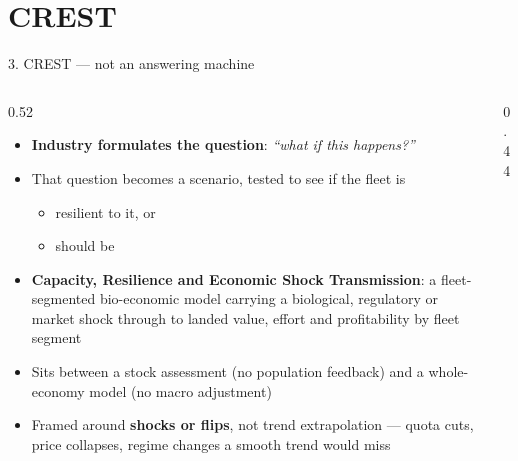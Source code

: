 \documentclass[10pt,aspectratio=169]{beamer}
\begin{document}
\section{CREST}

\begin{frame}{3. CREST --- not an answering machine}
  \begin{columns}[T]
    \begin{column}{0.52\textwidth}
      \footnotesize
      \begin{itemize}
        \item \textbf{Industry formulates the question}: \textit{``what if this happens?''}
        \item That question becomes a scenario, tested to see if the fleet is
          \begin{itemize}
            \item resilient to it, or
            \item should be
          \end{itemize}
        \item \textbf{Capacity, Resilience and Economic Shock Transmission}: a fleet-segmented bio-economic model carrying a biological, regulatory or market shock through to landed value, effort and profitability by fleet segment
        \item Sits between a stock assessment (no population feedback) and a whole-economy model (no macro adjustment)
        \item Framed around \textbf{shocks or flips}, not trend extrapolation --- quota cuts, price collapses, regime changes a smooth trend would miss
      \end{itemize}
    \end{column}
    \begin{column}{0.44\textwidth}
      \centering


\end{column}
\end{columns}
\end{frame}
\end{document}
